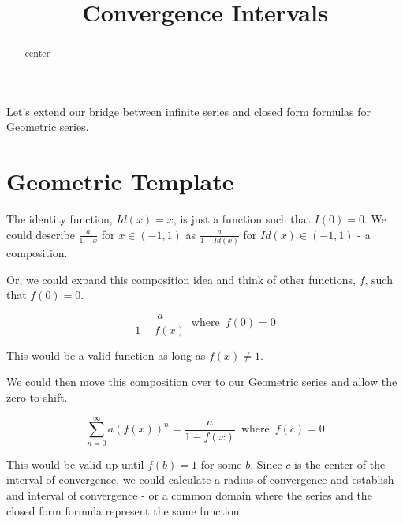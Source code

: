 \documentclass{ximera}
\title{Convergence Intervals}
\begin{document}
\begin{abstract}
center
\end{abstract}
\maketitle






Let's extend our bridge between infinite series and closed form formulas for Geometric series.





\section{Geometric Template}



The identity function, $Id(x) = x$, is just a function such that $I(0) = 0$.  We could describe $\frac{a}{1-x}$ for $x \in (-1, 1)$ as $\frac{a}{1-Id(x)}$ for $Id(x) \in (-1, 1)$ - a composition.

Or, we could expand this composition idea and think of other functions, $f$, such that $f(0) = 0$.



\[    \frac{a}{1-f(x)}   \, \text{ where } \, f(0) = 0       \]


This would be a valid function as long as $f(x) \ne 1$. 




We could then move this composition over to our Geometric series and allow the zero to shift.




\[   \sum_{n=0}^{\infty} a (f(x))^n =  \frac{a}{1-f(x)}   \, \text{ where } \, f(c) = 0       \]


This would be valid up until $f(b)=1$ for some $b$.  Since $c$ is the center of the interval of convergence, we could calculate a radius of convergence and establish and interval of convergence - or a common domain where the series and the closed form formula represent the same function.
\end{document}
